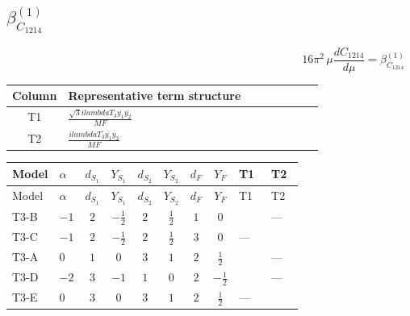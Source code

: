 \documentclass[8pt]{article}
\begin{document}
\begin{landscape}
\section*{$\beta_{C_{1214}}^{(1)}$}
\[16\pi^2\,\mu\frac{d C_{1214}}{d\mu}=\beta_{C_{1214}}^{(1)}\]
\begin{center}
\begin{tabular}{@{}c >{\raggedright\arraybackslash}p{0.82\linewidth}@{}}
\toprule
Column & Representative term structure \\
\midrule
T1 & \(\displaystyle \frac{\sqrt{3} i lambdaT_{3} \overline{y_{1}} \overline{y_{2}}}{MF}\) \\
\midrule
T2 & \(\displaystyle \frac{i lambdaT_{3} \overline{y_{1}} \overline{y_{2}}}{MF}\) \\
\midrule
\bottomrule
\end{tabular}
\end{center}
\smallskip
\tiny
\begin{longtable}{@{}llcccccc >{\raggedright\arraybackslash}p{0.21\linewidth} >{\raggedright\arraybackslash}p{0.21\linewidth}@{}}
\toprule
Model & $\alpha$ & $d_{S_1}$ & $Y_{S_1}$ & $d_{S_2}$ & $Y_{S_2}$ & $d_F$ & $Y_F$ & T1 & T2 \\
\midrule
\endfirsthead
\toprule
Model & $\alpha$ & $d_{S_1}$ & $Y_{S_1}$ & $d_{S_2}$ & $Y_{S_2}$ & $d_F$ & $Y_F$ & T1 & T2 \\
\midrule
\endhead
T3-B & $-1$ & $2$ & $-\frac{1}{2}$ & $2$ & $\frac{1}{2}$ & $1$ & $0$ & \scriptsize\adjustbox{max width=\linewidth}{$\begin{gathered} - \frac{\sqrt{3} i lambdaT_{3} \overline{y_{1}} \overline{y_{2}}}{3 MF}\end{gathered}$} & --- \\
\midrule
T3-C & $-1$ & $2$ & $-\frac{1}{2}$ & $2$ & $\frac{1}{2}$ & $3$ & $0$ & --- & \scriptsize\adjustbox{max width=\linewidth}{$\begin{gathered} \frac{2 i lambdaT_{3} \overline{y_{1}} \overline{y_{2}}}{3 MF}\end{gathered}$} \\
\midrule
T3-A & $0$ & $1$ & $0$ & $3$ & $1$ & $2$ & $\frac{1}{2}$ & \scriptsize\adjustbox{max width=\linewidth}{$\begin{gathered} - \frac{\sqrt{3} i lambdaT_{3} \overline{y_{1}} \overline{y_{2}}}{3 MF}\end{gathered}$} & --- \\
\midrule
T3-D & $-2$ & $3$ & $-1$ & $1$ & $0$ & $2$ & $-\frac{1}{2}$ & \scriptsize\adjustbox{max width=\linewidth}{$\begin{gathered} - \frac{\sqrt{3} i lambdaT_{3} \overline{y_{1}} \overline{y_{2}}}{3 MF}\end{gathered}$} & --- \\
\midrule
T3-E & $0$ & $3$ & $0$ & $3$ & $1$ & $2$ & $\frac{1}{2}$ & --- & \scriptsize\adjustbox{max width=\linewidth}{$\begin{gathered} \frac{i lambdaT_{3} \overline{y_{1}} \overline{y_{2}}}{MF}\end{gathered}$} \\
\midrule
\bottomrule
\end{longtable}
\clearpage

\end{landscape}
\end{document}
